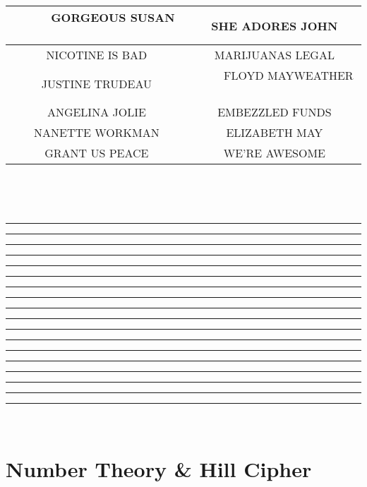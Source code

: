 \documentclass[12pt,emtex]{article}
\begin{document}
\begin{enumerate}
{\footnotesize \begin{center}
\begin{tabular}{|c|c|}  \hline
\ \ \ \ \ GORGEOUS SUSAN \ \ \ \ \ 
&
SHE ADORES JOHN
\\ \hline
NICOTINE IS BAD
&
MARIJUANAS LEGAL
\\ \hline
JUSTINE TRUDEAU
&
\ \ \ \ \ FLOYD MAYWEATHER \ \ \ \ \ 
\\ \hline
ANGELINA JOLIE
&
EMBEZZLED FUNDS \\ \hline
NANETTE WORKMAN
&
ELIZABETH MAY
\\ \hline
GRANT US PEACE
&
WE'RE AWESOME \\  \hline
\end{tabular}
\end{center}
}


\


\

\hrule \vspace{8mm}   \hrule \vspace{8mm}    
\hrule \vspace{8mm}   \hrule \vspace{8mm}
\hrule \vspace{8mm}   \hrule \vspace{8mm}    
\hrule \vspace{8mm}   \hrule \vspace{8mm}
\hrule \vspace{8mm}   \hrule \vspace{8mm}    
\hrule \vspace{8mm}   \hrule \vspace{8mm}
\hrule \vspace{8mm}   \hrule \vspace{8mm}
\hrule \vspace{8mm}   \hrule \vspace{8mm}    
\hrule \vspace{8mm}   \hrule \vspace{8mm}





\end{enumerate}

\newpage

\

\vspace{-20mm}

    
    \section{Number Theory \& Hill Cipher}
    
\end{document}
